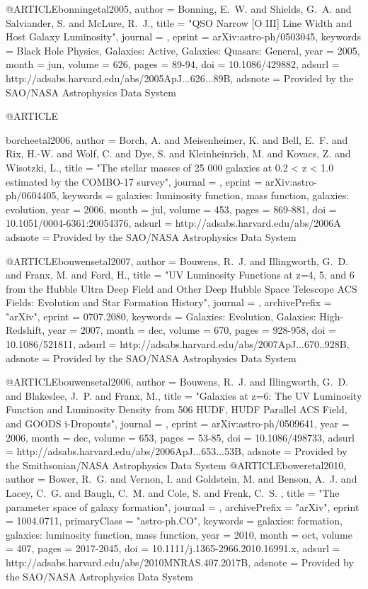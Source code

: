 {{{{{{{@ARTICLE{bonningetal2005,
   author = {{Bonning}, E.~W. and {Shields}, G.~A. and {Salviander}, S. and 
	{McLure}, R.~J.},
    title = "{QSO Narrow [O III] Line Width and Host Galaxy Luminosity}",
  journal = {\apj},
   eprint = {arXiv:astro-ph/0503045},
 keywords = {Black Hole Physics, Galaxies: Active, Galaxies: Quasars: General},
     year = 2005,
    month = jun,
   volume = 626,
    pages = {89-94},
      doi = {10.1086/429882},
   adsurl = {http://adsabs.harvard.edu/abs/2005ApJ...626...89B},
  adsnote = {Provided by the SAO/NASA Astrophysics Data System}
}


@ARTICLE{borcheetal2006,
   author = {{Borch}, A. and {Meisenheimer}, K. and {Bell}, E.~F. and {Rix}, H.-W. and 
	{Wolf}, C. and {Dye}, S. and {Kleinheinrich}, M. and {Kovacs}, Z. and 
	{Wisotzki}, L.},
    title = "{The stellar masses of 25 000 galaxies at 0.2 < z < 1.0 estimated by the COMBO-17 survey}",
  journal = {\aap},
   eprint = {arXiv:astro-ph/0604405},
 keywords = {galaxies: luminosity function, mass function, galaxies: evolution},
     year = 2006,
    month = jul,
   volume = 453,
    pages = {869-881},
      doi = {10.1051/0004-6361:20054376},
   adsurl = {http://adsabs.harvard.edu/abs/2006A%
  adsnote = {Provided by the SAO/NASA Astrophysics Data System}
}


@ARTICLE{bouwensetal2007,
   author = {{Bouwens}, R.~J. and {Illingworth}, G.~D. and {Franx}, M. and 
	{Ford}, H.},
    title = "{UV Luminosity Functions at z=4, 5, and 6 from the Hubble Ultra Deep Field and Other Deep Hubble Space Telescope ACS Fields: Evolution and Star Formation History}",
  journal = {\apj},
archivePrefix = "arXiv",
   eprint = {0707.2080},
 keywords = {Galaxies: Evolution, Galaxies: High-Redshift},
     year = 2007,
    month = dec,
   volume = 670,
    pages = {928-958},
      doi = {10.1086/521811},
   adsurl = {http://adsabs.harvard.edu/abs/2007ApJ...670..928B},
  adsnote = {Provided by the SAO/NASA Astrophysics Data System}
}


@ARTICLE{bouwensetal2006,
   author = {{Bouwens}, R.~J. and {Illingworth}, G.~D. and {Blakeslee}, J.~P. and 
	{Franx}, M.},
    title = "{Galaxies at z=6: The UV Luminosity Function and Luminosity Density from 506 HUDF, HUDF Parallel ACS Field, and GOODS i-Dropouts}",
  journal = {\apj},
   eprint = {arXiv:astro-ph/0509641},
     year = 2006,
    month = dec,
   volume = 653,
    pages = {53-85},
      doi = {10.1086/498733},
   adsurl = {http://adsabs.harvard.edu/abs/2006ApJ...653...53B},
  adsnote = {Provided by the Smithsonian/NASA Astrophysics Data System}
}
@ARTICLE{boweretal2010,
   author = {{Bower}, R.~G. and {Vernon}, I. and {Goldstein}, M. and {Benson}, A.~J. and 
	{Lacey}, C.~G. and {Baugh}, C.~M. and {Cole}, S. and {Frenk}, C.~S.
	},
    title = "{The parameter space of galaxy formation}",
  journal = {\mnras},
archivePrefix = "arXiv",
   eprint = {1004.0711},
 primaryClass = "astro-ph.CO",
 keywords = {galaxies: formation, galaxies: luminosity function, mass function},
     year = 2010,
    month = oct,
   volume = 407,
    pages = {2017-2045},
      doi = {10.1111/j.1365-2966.2010.16991.x},
   adsurl = {http://adsabs.harvard.edu/abs/2010MNRAS.407.2017B},
  adsnote = {Provided by the SAO/NASA Astrophysics Data System}
}


}}}}}}}}
